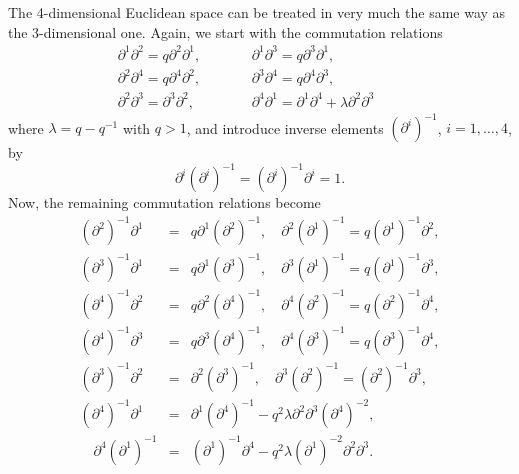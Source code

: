 \documentclass[a4paper,11pt,oneside]{article}
\begin{document}
The 4-dimensional Euclidean space can be treated in very much the same way
as the 3-dimensional one. Again, we start with the commutation relations 
\cite{Oca96} 
\begin{eqnarray}
\partial ^{1}\partial ^{2}=q\partial ^{2}\partial ^{1}, &&\qquad \partial
^{1}\partial ^{3}=q\partial ^{3}\partial ^{1}, \\
\partial ^{2}\partial ^{4}=q\partial ^{4}\partial ^{2}, &&\qquad \partial
^{3}\partial ^{4}=q\partial ^{4}\partial ^{3},  \nonumber \\
\partial ^{2}\partial ^{3}=\partial ^{3}\partial ^{2}, &&\qquad \partial
^{4}\partial ^{1}=\partial ^{1}\partial ^{4}+\lambda \partial ^{2}\partial
^{3}\qquad  \nonumber
\end{eqnarray}
where $\lambda =q-q^{-1}$ with $q>1$, and introduce inverse elements $\left(
\partial ^{i}\right) ^{-1}$, $i=1,\ldots,4$, by 
\begin{equation}
\partial ^{i}\left( \partial ^{i}\right) ^{-1} = \left( \partial
^{i}\right) ^{-1}\partial ^{i}=1.
\end{equation}
Now, the remaining commutation relations become 
\begin{eqnarray}
\left( \partial ^{2}\right) ^{-1}\partial ^{1} &=&q\partial ^{1}\left(
\partial ^{2}\right) ^{-1},\quad \partial ^{2}\left( \partial ^{1}\right)
^{-1}=q\left( \partial ^{1}\right) ^{-1}\partial ^{2}, \\
\left( \partial ^{3}\right) ^{-1}\partial ^{1} &=&q\partial ^{1}\left(
\partial ^{3}\right) ^{-1},\quad \partial ^{3}\left( \partial ^{1}\right)
^{-1}=q\left( \partial ^{1}\right) ^{-1}\partial ^{3},  \nonumber \\
\left( \partial ^{4}\right) ^{-1}\partial ^{2} &=&q\partial ^{2}\left(
\partial ^{4}\right) ^{-1},\quad \partial ^{4}\left( \partial ^{2}\right)
^{-1}=q\left( \partial ^{2}\right) ^{-1}\partial ^{4},  \nonumber \\
\left( \partial ^{4}\right) ^{-1}\partial ^{3} &=&q\partial ^{3}\left(
\partial ^{4}\right) ^{-1},\quad \partial ^{4}\left( \partial ^{3}\right)
^{-1}=q\left( \partial ^{3}\right) ^{-1}\partial ^{4},  \nonumber \\
\left( \partial ^{3}\right) ^{-1}\partial ^{2} &=&\partial ^{2}\left(
\partial ^{3}\right) ^{-1},\quad \partial ^{3}\left( \partial ^{2}\right)
^{-1}=\left( \partial ^{2}\right) ^{-1}\partial ^{3},  \nonumber \\
\left( \partial ^{4}\right) ^{-1}\partial ^{1} &=&\partial ^{1}\left(
\partial ^{4}\right) ^{-1}-q^{2}\lambda \partial ^{2}\partial ^{3}\left(
\partial ^{4}\right) ^{-2},  \nonumber \\
\quad \partial ^{4}\left( \partial ^{1}\right) ^{-1} &=&\left( \partial
^{1}\right) ^{-1}\partial ^{4}-q^{2}\lambda \left( \partial ^{1}\right)
^{-2}\partial ^{2}\partial ^{3}.  \nonumber
\end{eqnarray}
\end{document}
